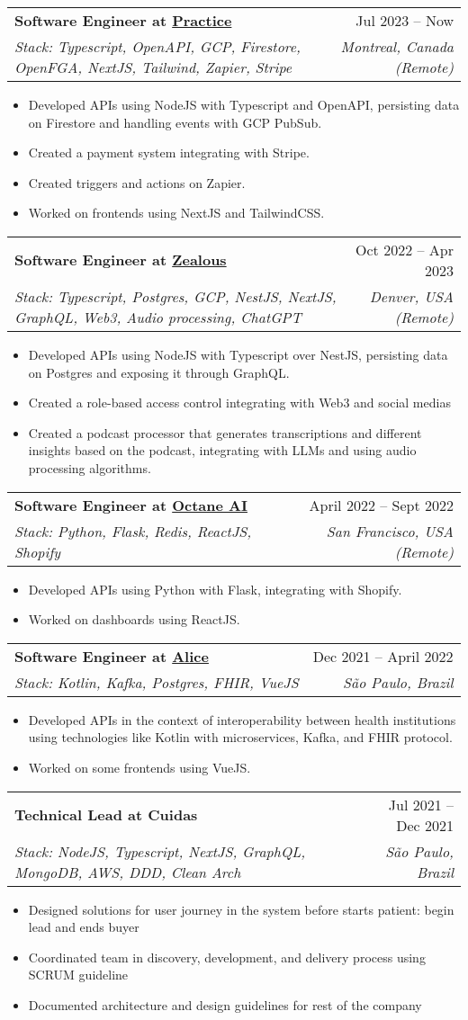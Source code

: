 \documentclass[letterpaper,10pt]{article}
\makeatletter
\newcommand{\resumeItem}[1]{
  \item\footnotesize{
    {#1 \vspace{-2pt}}
  }
}
\newcommand{\resumeSubheading}[4]{
  \vspace{6pt}\item
    \begin{tabular*}{0.97\textwidth}[t]{l@{\extracolsep{\fill}}r}
      \textbf{\small#1} & \small#2 \\
      \textit{\small#3} & \textit{\small #4} \\
    \end{tabular*}\vspace{-7pt}
}
\newcommand{\resumeItemListStart}{\vspace{1pt}\begin{itemize}}
\newcommand{\resumeItemListEnd}{\end{itemize}\vspace{-5pt}}
\makeatother
\begin{document}
    \resumeSubheading
      {Software Engineer at \href{https://practice.do}{Practice}}{Jul 2023 -- Now}
      {Stack: Typescript, OpenAPI, GCP, Firestore, OpenFGA, NextJS, Tailwind, Zapier, Stripe}      {Montreal, Canada (Remote)}
      \resumeItemListStart
        \resumeItem{Developed APIs using NodeJS with Typescript and OpenAPI, persisting data on Firestore and handling events with GCP PubSub.}
        \resumeItem{Created a payment system integrating with Stripe.}
        \resumeItem{Created triggers and actions on Zapier.}
        \resumeItem{Worked on frontends using NextJS and TailwindCSS.}
    \resumeItemListEnd

    \resumeSubheading
      {Software Engineer at \href{https://zealous.app/}{Zealous}}{Oct 2022 -- Apr 2023}
      {Stack: Typescript, Postgres, GCP, NestJS, NextJS, GraphQL, Web3, Audio processing, ChatGPT}{Denver, USA (Remote)}
      \resumeItemListStart
        \resumeItem{Developed APIs using NodeJS with Typescript over NestJS, persisting data on Postgres and exposing it through GraphQL.}
        \resumeItem{Created a role-based access control integrating with Web3 and social medias}
        \resumeItem{Created a podcast processor that generates transcriptions and different insights based on the podcast, integrating with LLMs and using audio processing algorithms.}
      \resumeItemListEnd

      \resumeSubheading
      {Software Engineer at \href{https://www.octaneai.com/}{Octane AI}}{April 2022 -- Sept 2022}
      {Stack: Python, Flask, Redis, ReactJS, Shopify}{San Francisco, USA (Remote)}
      \resumeItemListStart
        \resumeItem{Developed APIs using Python with Flask, integrating with Shopify.}
        \resumeItem{Worked on dashboards using ReactJS.}
      \resumeItemListEnd   

      \resumeSubheading
      {Software Engineer at \href{https://alice.com.br/}{Alice}}{Dec 2021 -- April 2022}
      {Stack: Kotlin, Kafka, Postgres, FHIR, VueJS}{São Paulo, Brazil}
      \resumeItemListStart
        \resumeItem{Developed APIs in the context of interoperability between health institutions using technologies like Kotlin with microservices, Kafka, and FHIR protocol.}
        \resumeItem{Worked on some frontends using VueJS.}
      \resumeItemListEnd     
      
      \resumeSubheading
      {Technical Lead at Cuidas}{Jul 2021 -- Dec 2021}
      {Stack: NodeJS, Typescript, NextJS, GraphQL, MongoDB, AWS, DDD, Clean Arch}{São Paulo, Brazil}
      \resumeItemListStart
        \resumeItem{Designed solutions for user journey in the system before starts patient: begin lead and ends buyer}        
        \resumeItem{Coordinated team in discovery, development, and delivery process using SCRUM guideline}        
        \resumeItem{Documented architecture and design guidelines for rest of the company}   
      \resumeItemListEnd 
        
\end{document}
